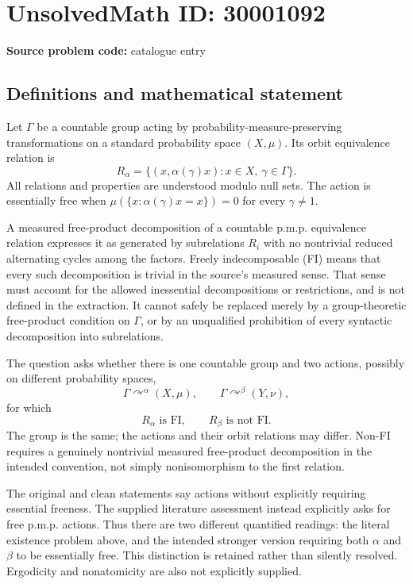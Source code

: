 \documentclass[11pt]{article}
\begin{document}
\section*{UnsolvedMath ID: 30001092}
\textbf{Source problem code:} catalogue entry
\subsection{Definitions and mathematical statement}
Let \(\Gamma\) be a countable group acting by probability-measure-preserving transformations on a standard probability space \((X,\mu)\). Its orbit equivalence relation is
\[
 R_\alpha=\{(x,\alpha(\gamma)x):x\in X,\ \gamma\in\Gamma\}.
\]
All relations and properties are understood modulo null sets. The action is essentially free when \(\mu(\{x:\alpha(\gamma)x=x\})=0\) for every \(\gamma\ne1\).

A measured free-product decomposition of a countable p.m.p. equivalence relation expresses it as generated by subrelations \(R_i\) with no nontrivial reduced alternating cycles among the factors. Freely indecomposable (FI) means that every such decomposition is trivial in the source's measured sense. That sense must account for the allowed inessential decompositions or restrictions, and is not defined in the extraction. It cannot safely be replaced merely by a group-theoretic free-product condition on \(\Gamma\), or by an unqualified prohibition of every syntactic decomposition into subrelations.

The question asks whether there is one countable group and two actions, possibly on different probability spaces,
\[
 \Gamma\curvearrowright^{\alpha}(X,\mu),\qquad
 \Gamma\curvearrowright^{\beta}(Y,\nu),
\]
for which
\[
 R_\alpha\text{ is FI},\qquad R_\beta\text{ is not FI}.
\]
The group is the same; the actions and their orbit relations may differ. Non-FI requires a genuinely nontrivial measured free-product decomposition in the intended convention, not simply nonisomorphism to the first relation.

The original and clean statements say actions without explicitly requiring essential freeness. The supplied literature assessment instead explicitly asks for free p.m.p. actions. Thus there are two different quantified readings: the literal existence problem above, and the intended stronger version requiring both \(\alpha\) and \(\beta\) to be essentially free. This distinction is retained rather than silently resolved. Ergodicity and nonatomicity are also not explicitly supplied.
\end{document}
